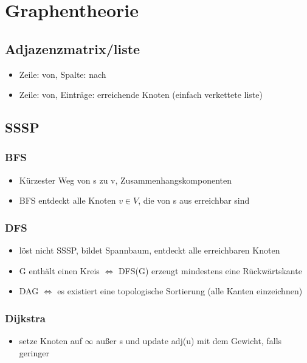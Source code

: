 \documentclass{article}
\begin{document}
\section{Graphentheorie}
\subsection{Adjazenzmatrix/liste}
\begin{itemize}
\item Zeile: von, Spalte: nach
\item Zeile: von, Eintr{\"a}ge: erreichende Knoten (einfach verkettete liste)
\end{itemize}

\subsection{SSSP}
\subsubsection{BFS}
\begin{itemize}
\item Kürzester Weg von s zu v, Zusammenhangskomponenten
\item BFS entdeckt alle Knoten $v\in V$, die von s aus erreichbar sind
\end{itemize}

\subsubsection{DFS}
\begin{itemize}
\item l{\"o}st nicht SSSP, bildet Spannbaum, entdeckt alle erreichbaren Knoten
\item G enth{\"a}lt einen Kreis $\Leftrightarrow$ DFS(G) erzeugt mindestens eine R{\"u}ckw{\"a}rtskante
\item DAG $\Leftrightarrow$ es existiert eine topologische Sortierung (alle Kanten einzeichnen)
\end{itemize}

\subsubsection{Dijkstra}
\begin{itemize}
\item setze Knoten auf $\infty$  au\ss er s und update adj(u) mit dem Gewicht, falls geringer 
\end{itemize}
\end{document}
